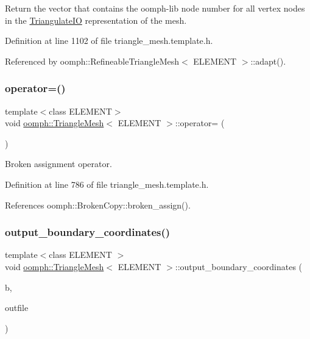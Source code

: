 Return the vector that contains the oomph-\/lib node number for all vertex nodes in the \hyperlink{structoomph_1_1TriangulateIO}{Triangulate\+IO} representation of the mesh. 



Definition at line 1102 of file triangle\+\_\+mesh.\+template.\+h.



Referenced by oomph\+::\+Refineable\+Triangle\+Mesh$<$ E\+L\+E\+M\+E\+N\+T $>$\+::adapt().

\mbox{\label{classoomph_1_1TriangleMesh_a246acfb459ba11cc8b21132ace403e3c}} 
\subsubsection{\texorpdfstring{operator=()}{operator=()}}
{\footnotesize\ttfamily template$<$class E\+L\+E\+M\+E\+NT$>$ \\
void \hyperlink{classoomph_1_1TriangleMesh}{oomph\+::\+Triangle\+Mesh}$<$ E\+L\+E\+M\+E\+NT $>$\+::operator= (\begin{DoxyParamCaption}\item[{const \hyperlink{classoomph_1_1TriangleMesh}{Triangle\+Mesh}$<$ E\+L\+E\+M\+E\+NT $>$ \&}]{ }\end{DoxyParamCaption})\hspace{0.3cm}{\ttfamily [inline]}}



Broken assignment operator. 



Definition at line 786 of file triangle\+\_\+mesh.\+template.\+h.



References oomph\+::\+Broken\+Copy\+::broken\+\_\+assign().

\mbox{\label{classoomph_1_1TriangleMesh_ac7ea71980a3512c16a4ead623988a1e8}} 
\subsubsection{\texorpdfstring{output\+\_\+boundary\+\_\+coordinates()}{output\_boundary\_coordinates()}}
{\footnotesize\ttfamily template$<$class E\+L\+E\+M\+E\+NT $>$ \\
void \hyperlink{classoomph_1_1TriangleMesh}{oomph\+::\+Triangle\+Mesh}$<$ E\+L\+E\+M\+E\+NT $>$\+::output\+\_\+boundary\+\_\+coordinates (\begin{DoxyParamCaption}\item[{const unsigned \&}]{b,  }\item[{std\+::ostream \&}]{outfile }\end{DoxyParamCaption})}

